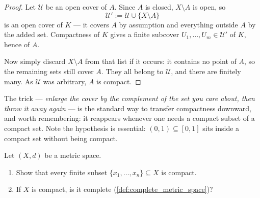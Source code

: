 \begin{proof}
Let $\mathcal{U}$ be an open cover of $A$. Since $A$ is closed, $X\setminus A$ is open, so
\[\mathcal{U}' := \mathcal{U} \cup \{X\setminus A\}\]
is an open cover of $K$ --- it covers $A$ by assumption and everything outside $A$ by the added
set. Compactness of $K$ gives a finite subcover
$U_{1},\dots,U_{m} \in \mathcal{U}'$ of $K$, hence of $A$.

\begin{center}
\end{center}

Now simply discard $X\setminus A$ from that list if it occurs: it contains no point of $A$, so
the remaining sets still cover $A$. They all belong to $\mathcal{U}$, and there are finitely
many. As $\mathcal{U}$ was arbitrary, $A$ is compact.
\end{proof}

\begin{ainote}
The trick --- \emph{enlarge the cover by the complement of the set you care about, then throw it
away again} --- is the standard way to transfer compactness downward, and worth remembering: it
reappears whenever one needs a compact subset of a compact set. Note the hypothesis 
is essential: $(0,1) \subseteq [0,1]$ sits inside a compact set without being compact.
\end{ainote}

\begin{exercise}
\label{ex:compact_finite_complete}
Let $(X,d)$ be a metric space.
\begin{enumerate}[label=\textbf{(\alph*)}]
  \item Show that every finite subset $\{x_1, \dots, x_n\} \subseteq X$ is compact.
  \item If $X$ is compact, is it complete (\cref{def:complete_metric_space})?
\end{enumerate}
\end{exercise}

